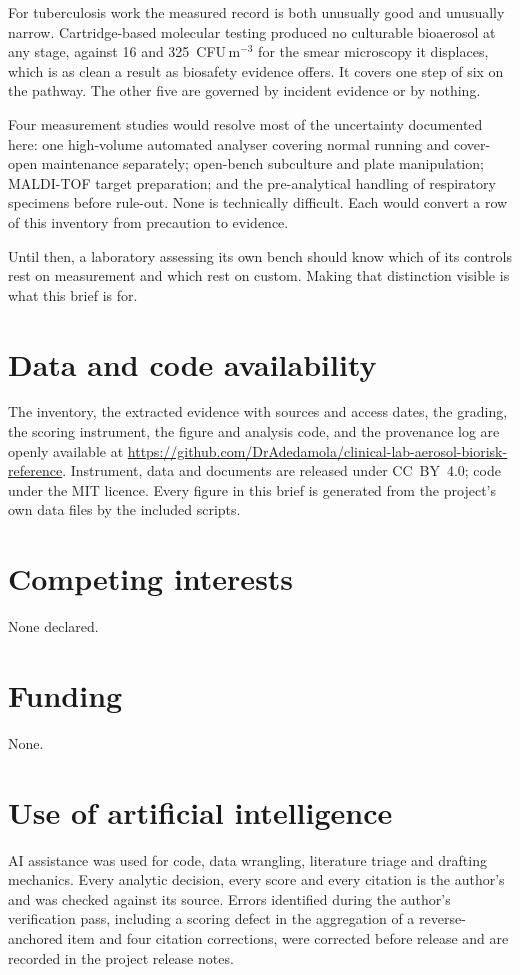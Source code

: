 For tuberculosis work the measured record is both unusually good and unusually
narrow. Cartridge-based molecular testing produced no culturable bioaerosol at
any stage, against 16 and 325~CFU\,m$^{-3}$ for the smear microscopy it
displaces, which is as clean a result as biosafety evidence offers. It covers
one step of six on the pathway. The other five are governed by incident
evidence or by nothing.

Four measurement studies would resolve most of the uncertainty documented here:
one high-volume automated analyser covering normal running and cover-open
maintenance separately; open-bench subculture and plate manipulation; MALDI-TOF
target preparation; and the pre-analytical handling of respiratory specimens
before rule-out. None is technically difficult. Each would convert a row of
this inventory from precaution to evidence.

Until then, a laboratory assessing its own bench should know which of its
controls rest on measurement and which rest on custom. Making that distinction
visible is what this brief is for.

\section*{Data and code availability}

The inventory, the extracted evidence with sources and access dates, the
grading, the scoring instrument, the figure and analysis code, and the
provenance log are openly available at
\url{https://github.com/DrAdedamola/clinical-lab-aerosol-biorisk-reference}.
Instrument, data and documents are released under CC~BY~4.0; code under the
MIT licence. Every figure in this brief is generated from the project's own
data files by the included scripts.

\section*{Competing interests}

None declared.

\section*{Funding}

None.

\section*{Use of artificial intelligence}

AI assistance was used for code, data wrangling, literature triage and drafting
mechanics. Every analytic decision, every score and every citation is the
author's and was checked against its source. Errors identified during the
author's verification pass, including a scoring defect in the aggregation of a
reverse-anchored item and four citation corrections, were corrected before
release and are recorded in the project release notes.
